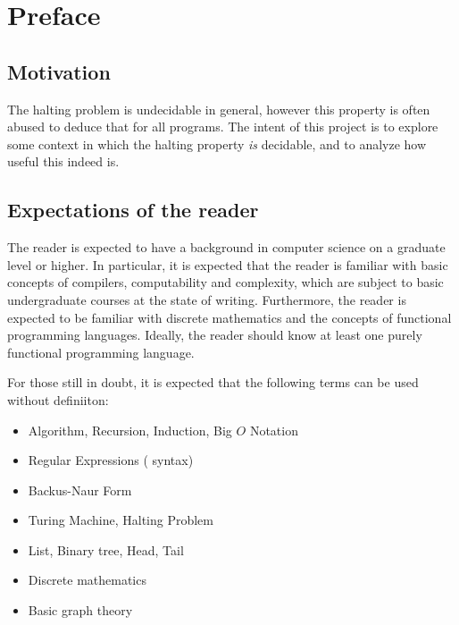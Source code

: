 \chapter{Preface}

\section{Motivation}

The halting problem is undecidable in general, however this property is often
abused to deduce that for all programs. The intent of this project is to
explore some context in which the halting property \emph{is} decidable, and to
analyze how useful this indeed is.

\section{Expectations of the reader}

The reader is expected to have a background in computer science on a graduate
level or higher. In particular, it is expected that the reader is familiar with
basic concepts of compilers, computability and complexity, which are subject to
basic undergraduate courses at the state of writing. Furthermore, the reader is
expected to be familiar with discrete mathematics and the concepts of
functional programming languages. Ideally, the reader should know at least one
purely functional programming language.

For those still in doubt, it is expected that the following terms can be used
without definiiton:

\begin{itemize}

\item Algorithm, Recursion, Induction, Big $O$ Notation

\item Regular Expressions ( syntax)

\item Backus-Naur Form

\item Turing Machine, Halting Problem

\item List, Binary tree, Head, Tail

\item Discrete mathematics

\item Basic graph theory

\end{itemize}


